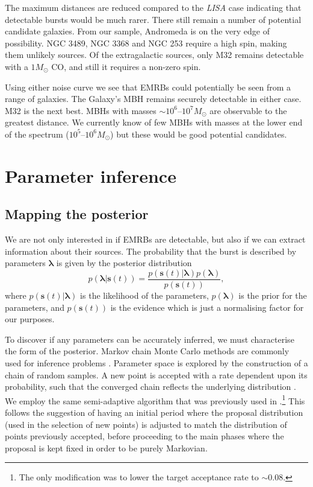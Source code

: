 \documentclass[useAMS,usedcolumn,usegraphicx,usenatbib]{mn2e}
\begin{document}
The maximum distances are reduced compared to the \textit{LISA} case indicating that detectable bursts would be much rarer. There still remain a number of potential candidate galaxies. From our sample, Andromeda is on the very edge of possibility. NGC 3489, NGC 3368 and NGC 253 require a high spin, making them unlikely sources. Of the extragalactic sources, only M32 remains detectable with a $1 M_\odot$ CO, and still it requires a non-zero spin.

Using either noise curve we see that EMRBs could potentially be seen from a range of galaxies. The Galaxy's MBH remains securely detectable in either case. M32 is the next best. MBHs with masses $\sim 10^6$--$10^7 M_\odot$ are observable to the greatest distance. We currently know of few MBHs with masses at the lower end of the spectrum ($10^5$--$10^6 M_\odot$) but these would be good potential candidates.

\section{Parameter inference}\label{sec:Infer}

\subsection{Mapping the posterior}\label{sec:MCMC}

We are not only interested in if EMRBs are detectable, but also if we can extract information about their sources. The probability that the burst is described by parameters $\boldsymbol{\lambda}$ is given by the posterior distribution
\begin{equation}
p(\boldsymbol{\lambda}|\boldsymbol{s}(t)) = \frac{p(\boldsymbol{s}(t)|\boldsymbol{\lambda})p(\boldsymbol{\lambda})}{p(\boldsymbol{s}(t))},
\end{equation}
where $p(\boldsymbol{s}(t)|\boldsymbol{\lambda})$ is the likelihood of the parameters, $p(\boldsymbol{\lambda})$ is the prior for the parameters, and $p(\boldsymbol{s}(t))$ is the evidence which is just a normalising factor for our purposes.

To discover if any parameters can be accurately inferred, we must characterise the form of the posterior. Markov chain Monte Carlo methods are commonly used for inference problems \citep[chapter 29]{MacKay2003}. Parameter space is explored by the construction of a chain of random samples. A new point is accepted with a rate dependent upon its probability, such that the converged chain reflects the underlying distribution \citep{Metropolis1953,Hastings1970}. We employ the same semi-adaptive algorithm that was previously used in \citet{Berry2013}.\footnote{The only modification was to lower the target acceptance rate to $\sim0.08$.} This follows the suggestion of \citet{Haario1999} having an initial period where the proposal distribution (used in the selection of new points) is adjusted to match the distribution of points previously accepted, before proceeding to the main phases where the proposal is kept fixed in order to be purely Markovian.
\end{document}
